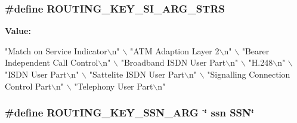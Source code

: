 \subsubsection[{R\+O\+U\+T\+I\+N\+G\+\_\+\+K\+E\+Y\+\_\+\+S\+I\+\_\+\+A\+R\+G\+\_\+\+S\+T\+RS}]{\setlength{\rightskip}{0pt plus 5cm}\#define R\+O\+U\+T\+I\+N\+G\+\_\+\+K\+E\+Y\+\_\+\+S\+I\+\_\+\+A\+R\+G\+\_\+\+S\+T\+RS}\label{osmo__ss7__vty_8c_a51a8928c6df0c567dbb910a84e210827}
{\bfseries Value\+:}
\begin{DoxyCode}
\textcolor{stringliteral}{"Match on Service Indicator\(\backslash\)n"} \(\backslash\)
        \textcolor{stringliteral}{"ATM Adaption Layer 2\(\backslash\)n"} \(\backslash\)
        \textcolor{stringliteral}{"Bearer Independent Call Control\(\backslash\)n"} \(\backslash\)
        \textcolor{stringliteral}{"Broadband ISDN User Part\(\backslash\)n"} \(\backslash\)
        \textcolor{stringliteral}{"H.248\(\backslash\)n"} \(\backslash\)
        \textcolor{stringliteral}{"ISDN User Part\(\backslash\)n"} \(\backslash\)
        \textcolor{stringliteral}{"Sattelite ISDN User Part\(\backslash\)n"} \(\backslash\)
        \textcolor{stringliteral}{"Signalling Connection Control Part\(\backslash\)n"} \(\backslash\)
        \textcolor{stringliteral}{"Telephony User Part\(\backslash\)n"}
\end{DoxyCode}
\subsubsection[{R\+O\+U\+T\+I\+N\+G\+\_\+\+K\+E\+Y\+\_\+\+S\+S\+N\+\_\+\+A\+RG}]{\setlength{\rightskip}{0pt plus 5cm}\#define R\+O\+U\+T\+I\+N\+G\+\_\+\+K\+E\+Y\+\_\+\+S\+S\+N\+\_\+\+A\+RG~\char`\"{} ssn S\+SN\char`\"{}}\label{osmo__ss7__vty_8c_a04f81e6b512b7d50c66efa65c975489e}
